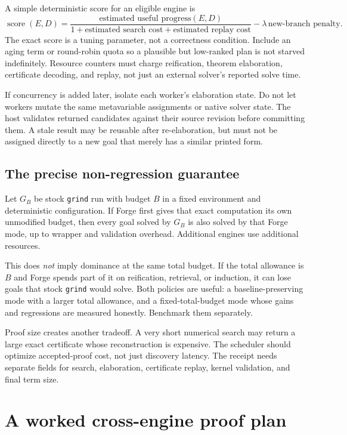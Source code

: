 \documentclass[11pt,letterpaper]{article}
\newcommand{\Forge}{\textsf{Forge}}
\newcommand{\grind}{\texttt{grind}}
\theoremstyle{definition}
\theoremstyle{remark}
\begin{document}
A simple deterministic score for an eligible engine is
\[
\operatorname{score}(E,D)=
\frac{\text{estimated useful progress}(E,D)}
 {1+\text{estimated search cost}+\text{estimated replay cost}}
-\lambda\,\text{new-branch penalty}.
\]
The exact score is a tuning parameter, not a correctness condition. Include an aging term or round-robin quota so a plausible but low-ranked plan is not starved indefinitely. Resource counters must charge reification, theorem elaboration, certificate decoding, and replay, not just an external solver's reported solve time.

If concurrency is added later, isolate each worker's elaboration state. Do not let workers mutate the same metavariable assignments or native solver state. The host validates returned candidates against their source revision before committing them. A stale result may be reusable after re-elaboration, but must not be assigned directly to a new goal that merely has a similar printed form.

\subsection{The precise non-regression guarantee}
Let $G_B$ be stock \grind{} run with budget $B$ in a fixed environment and deterministic configuration. If \Forge{} first gives that exact computation its own unmodified budget, then every goal solved by $G_B$ is also solved by that \Forge{} mode, up to wrapper and validation overhead. Additional engines use additional resources.

This does \emph{not} imply dominance at the same total budget. If the total allowance is $B$ and \Forge{} spends part of it on reification, retrieval, or induction, it can lose goals that stock \grind{} would solve. Both policies are useful: a baseline-preserving mode with a larger total allowance, and a fixed-total-budget mode whose gains and regressions are measured honestly. Benchmark them separately.

Proof size creates another tradeoff. A very short numerical search may return a large exact certificate whose reconstruction is expensive. The scheduler should optimize accepted-proof cost, not just discovery latency. The receipt needs separate fields for search, elaboration, certificate replay, kernel validation, and final term size.

\section{A worked cross-engine proof plan}
\end{document}
